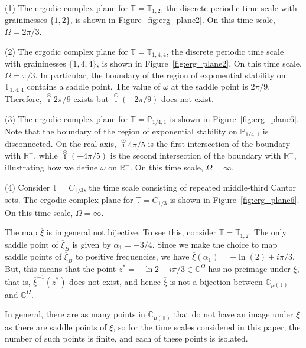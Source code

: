 \documentclass[reqno]{amsart}
\begin{document}
\begin{example}  \rm \quad

(1) The ergodic complex plane for $\mathbb{T}=\mathbb{T}_{1,2}$, the discrete periodic
time scale with graininesses $\{1,2\}$, is shown in Figure~\ref{fig:erg_plane2}. On this
time scale, $\Omega=2 \pi/3$.

(2) The ergodic complex plane for $\mathbb{T}=\mathbb{T}_{1,4,4}$, the discrete periodic
time scale with graininesses $\{1,4,4\}$, is shown in Figure~\ref{fig:erg_plane2}.
On this time scale, $\Omega=\pi/3$. In particular, the boundary of the region of
exponential stability on $\mathbb{T}_{1,4,4}$ contains a saddle point. The value of
$\omega$ at the saddle point is $2 \pi/9$. Therefore, $\overset{\odot}{\imath} 2\pi/9$ exists but
 $\overset{\odot}{\imath} (-2\pi/9)$ does not exist.

(3) The ergodic complex plane for $\mathbb{T}=\mathbb{P}_{1/4,1}$ is shown in
Figure~\ref{fig:erg_plane6}. Note that the boundary of the region of exponential
stability on $\mathbb{P}_{1/4,1}$ is disconnected. On the real axis, $\overset{\odot}{\imath} 4\pi/5$
is the first intersection of the boundary with $\mathbb{R}^-$, while $\overset{\odot}{\imath} (-4\pi/5)$ is
the second intersection of the boundary with $\mathbb{R}^-$, illustrating how we define
$\omega$ on $\mathbb{R}^-$. On this time scale, $\Omega=\infty$.

(4) Consider $\mathbb{T}=C_{1/3}$, the time scale consisting of repeated middle-third
Cantor sets. The ergodic complex plane for $\mathbb{T}=C_{1/3}$ is shown in
Figure~\ref{fig:erg_plane6}. On this time scale, $\Omega=\infty$.
\end{example}

\begin{example}
\label{ex:T12notBijective} \rm
The map $\overline{\xi}$ is in general not bijective. To see this, consider $\mathbb{T} = \mathbb{T}_{1,2}$.
The only saddle point of $\overline{\xi}_B$ is given by $\alpha_1 = -3/4$. Since we make the
choice to map saddle points of $\overline{\xi}_B$ to positive frequencies, we have
$\overline{\xi}(\alpha_1) = -\ln(2) + i \pi/3$. But, this means that the point
$z^{*} = -\ln 2-i\pi /3 \in \mathbb{C}^{\Omega}$ has no preimage under $\overline{\xi}$, that is,
$\overline{\xi}^{-1}(z^*)$ does not exist, and hence $\overline{\xi}$ is not a bijection between
$\mathbb{C}_{\mu(\mathbb{T})}$ and $\mathbb{C}^{\Omega}$.

In general, there are as many points in $\mathbb{C}_{\mu(\mathbb{T})}$ that do not have an image under
$\overline{\xi}$ as there are saddle points of $\overline{\xi}$, so for the time scales considered
in this paper, the number of such points is finite, and each of these points
is isolated.
\end{example}
\end{document}
